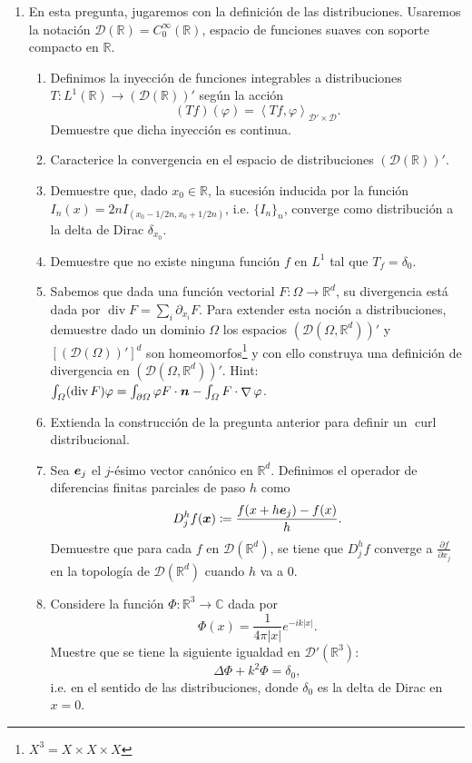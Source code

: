 \documentclass{article}
\renewcommand{\vec}{\vectorsym}
\DeclareMathOperator{\grad}{\nabla}
\DeclareMathOperator{\dive}{\text{div}}
\DeclareMathOperator{\curl}{\text{curl}}
\newcommand{\R}{\mathbb{R}}
\newcommand{\pts}[1]{[{\bf #1 puntos}] }
\begin{document}
\begin{enumerate}
    \item En esta pregunta, jugaremos con la definición de las distribuciones. Usaremos la notación $\mathcal D(\R) = C_0^\infty(\R)$, espacio de funciones suaves con soporte compacto en $\R$.
        \begin{enumerate}
            \item\pts{1} Definimos la inyección de funciones integrables a distribuciones $T:L^1(\R) \to \left(\mathcal D(\R)\right)'$ según la acción
                $$ (Tf)(\varphi)  = \left\langle Tf, \varphi\right\rangle_{\mathcal D'\times \mathcal D}.$$
                Demuestre que dicha inyección es continua. 
            \item\pts{1}Caracterice la convergencia en el espacio de distribuciones $\left(\mathcal D(\R)\right)'$. 
            \item\pts{1}Demuestre que, dado $x_0\in \R$,  la sucesión inducida por la función $I_n(x) = 2nI_{(x_0-1/2n, x_0+1/2n)}$, i.e. $\{I_n\}_n$, converge como distribución a la delta de Dirac $\delta_{x_0}$. 
            \item\pts{1}Demuestre que no existe ninguna función $f$ en $L^1$ tal que $T_f = \delta_0$. 
            \item\pts{2} Sabemos que dada una función vectorial $F:\Omega \to \R^d$, su divergencia está dada por $\dive F=\sum_i \partial_{x_i}F$. Para extender esta noción a distribuciones, demuestre dado un dominio $\Omega$ los espacios $(\mathcal D(\Omega, \R^d))'$ y $[(\mathcal D(\Omega))']^d$ son homeomorfos\footnote{$X^3 = X\times X\times X$} y con ello construya una definición de divergencia en $(\mathcal D(\Omega, \R^d))'$. Hint: $\int_\Omega (\dive F)\varphi = \int_{\partial\Omega} \varphi F\cdot \vec n - \int_\Omega F\cdot \grad \varphi$. 
            \item\pts{2} Extienda la construcción de la pregunta anterior para definir un $\curl$ distribucional.
            \item\pts{2} Sea $\vec e_j$ el $j$-ésimo vector canónico en $\R^d$. Definimos el operador de diferencias finitas parciales de paso $h$ como
                $$ D_j^hf(\vec x) \coloneqq \frac{f(x+h\vec e_j) - f(x)}{h}. $$
                Demuestre que para cada $f$ en $\mathcal D(\R^d)$, se tiene que $D_j^hf $ converge a $\frac{\partial f}{\partial x_j}$ en la topología de $\mathcal D(\R^d)$ cuando $h$ va a 0.  
            \item\pts{2} Considere la función $\Phi:\R^3\to \mathbb C$ dada por
                    $$ \Phi(x) = \frac{1}{4\pi|x|} e^{-ik |x|}. $$
                Muestre que se tiene la siguiente igualdad en $\mathcal D'(\R^3)$:
                        $$ \Delta \Phi + k^2 \Phi = \delta_0, $$
                i.e. en el sentido de las distribuciones, donde $\delta_0$ es la delta de Dirac en $x=0$. 
        \end{enumerate}
\end{enumerate}

\end{document}
